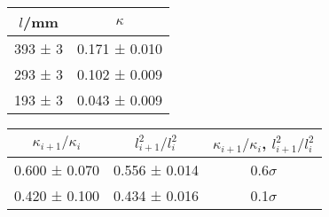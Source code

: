 \documentclass[12pt,a4paper,german]{scrartcl}
\begin{document}
  \begin{center}
    \begin{tabular}{c|c}
      $l$/mm & $\kappa$ \\
      \hline
      393 ± 3 & 0.171 ± 0.010 \\
      293 ± 3 & 0.102 ± 0.009 \\
      193 ± 3 & 0.043 ± 0.009
    \end{tabular}
    \label{table_beats_coupling_factors}
  \end{center}

  \begin{center}
    \begin{tabular}{c|c|c}
      $\kappa_{i+1} / \kappa_i$ & $l_{i+1}^2/l_i^2$ & $\kappa_{i+1} / \kappa_i$, $l_{i+1}^2/l_i^2$ \\
      \hline
      0.600 ± 0.070 & 0.556 ± 0.014 & 0.6$\sigma$ \\
      0.420 ± 0.100 & 0.434 ± 0.016 & 0.1$\sigma$
    \end{tabular}
    \label{table_beats_coupling_factors_ratio}
  \end{center}
\end{document}
